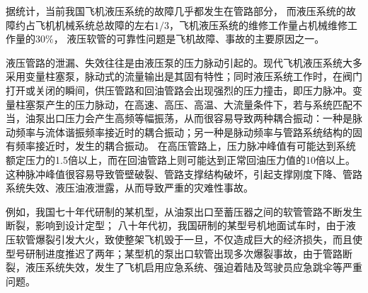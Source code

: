 据统计，当前我国飞机液压系统的故障几乎都发生在管路部分，
而液压系统的故障约占飞机机械系统总故障的左右$1/3 $，飞机液压系统的维修工作量占机械维修工作量的$ 30\%$\cite{lijun2007}，
液压软管的可靠性问题是飞机故障、事故的主要原因之一。

液压管路的泄漏、失效往往是由液压泵的压力脉动引起的。现代飞机液压系统大多采用变量柱塞泵，脉动式的流量输出是其固有特性；同时液压系统工作时，在阀门打开或关闭的瞬间，供压管路和回油管路会出现强烈的压力撞击，即压力脉冲。变量柱塞泵产生的压力脉动，在高速、高压、高温、大流量条件下，若与系统匹配不当，油泵出口压力会产生高频等幅振荡，从而很容易导致两种耦合振动：一种是脉动频率与流体谐振频率接近时的耦合振动；另一种是脉动频率与管路系统结构的固有频率接近时，发生的耦合振动。
在高压管路上，压力脉冲峰值有可能达到系统额定压力的1.5倍以上，而在回油管路上则可能达到正常回油压力值的10倍以上\cite{lijun2007}。
这种脉冲峰值很容易导致管壁破裂、管路支撑结构破坏，引起支撑刚度下降、管路系统失效、液压油液泄露，从而导致严重的灾难性事故\cite{gaofeng2013}。


例如，我国七十年代研制的某机型，从油泵出口至蓄压器之间的软管管路不断发生断裂，影响到设计定型；
八十年代初，我国研制的某型号机地面试车时，由于液压软管爆裂引发大火，致使整架飞机毁于一旦，不仅造成巨大的经济损失，而且使型号研制进度推迟了两年；某型机的泵出口软管出现多次爆裂事故，由于管路断裂，液压系统失效，发生了飞机启用应急系统、强迫着陆及驾驶员应急跳伞等严重问题\cite{lijun2007,guoqing2010,gaofeng2013}。

\begin{figure}
	\centering
	\hspace{1cm}
	\label{fig:plane-hose-2}
\end{figure}



